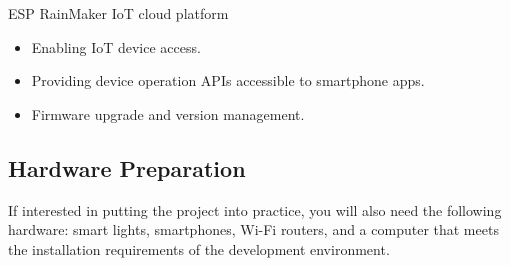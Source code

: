 \documentclass[a4paper,12pt]{book}
\begin{document}
\begin{term}{ESP RainMaker IoT cloud platform}
    \begin{itemize}
        \item Enabling IoT device access.
        \item Providing device operation APIs accessible to smartphone apps.
        \item Firmware upgrade and version management.
    \end{itemize}
\end{term}

\subsection{Hardware Preparation}
If interested in putting the project into practice, you will also need the following hardware: smart lights, smartphones, Wi-Fi routers, and a computer that meets the installation requirements of the development environment.
\end{document}

